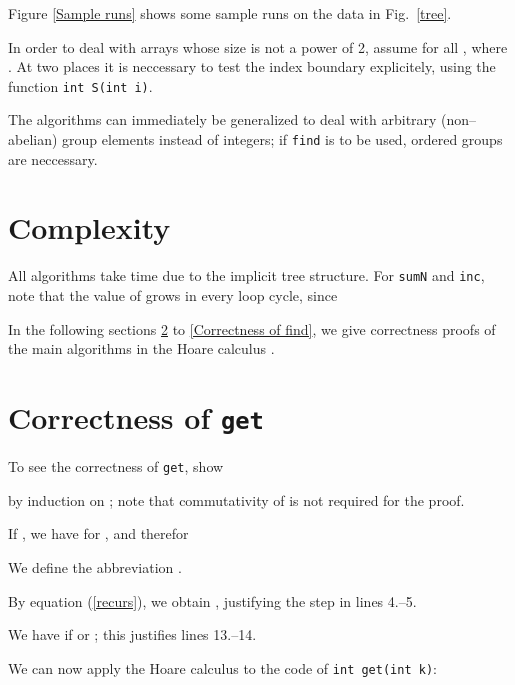 \documentclass{elsartNoFoot}
\newcommand{\1}{\color{red}}
\newcommand{\2}{\color{green}}
\newcommand{\+}[3]{{\renewcommand{\i}{{#1}}{#3},\ldots,\renewcommand{\i}{{#2}}{#3}}}
\begin{document}
Figure \ref{Sample runs} shows some sample runs on the data in
Fig.~\ref{tree}.


In order to deal with arrays whose size is not a
power of 2, assume  for all , where
. At two places it is neccessary to test
the index boundary explicitely, using the function {\tt int S(int i)}.

The algorithms can immediately be generalized to deal with arbitrary
(non--abelian) group elements instead of integers; if {\tt find} is to
be used, ordered groups are neccessary.








\section{Complexity}
\label{Complexity}


All algorithms take  time due to the implicit tree
structure.
For {\tt sumN} and {\tt inc}, note that the value of 
grows in every loop cycle, since



In the following sections \ref{Correctness of get} to
\ref{Correctness of find}, we give correctness proofs of the main
algorithms in the Hoare calculus \cite{Hoare.1969}.






\section{Correctness of {\tt get}}
\label{Correctness of get}

To see the correctness of {\tt get}, show



by induction on ;
note that commutativity of  is not required for the proof.

If , we have  for ,
and therefor 



We define the abbreviation
 .

By equation (\ref{recurs}), we obtain 
, 
justifying the step in lines 4.--5.

We have  if  or
; this justifies lines 13.--14.

We can now apply the Hoare calculus to the code of
\verb|int get(int k)|:
\end{document}
